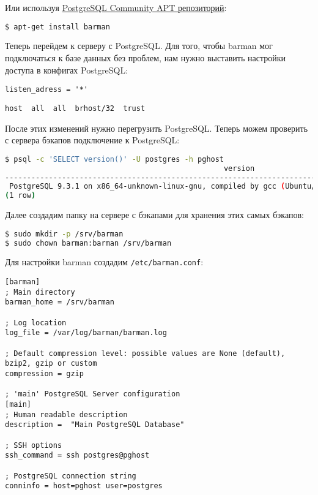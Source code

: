 Или используя \href{https://wiki.postgresql.org/wiki/Apt}{PostgreSQL Community APT репозиторий}:

\begin{lstlisting}[language=Bash,label=lst:barman-apt1,caption=Установка barman]
$ apt-get install barman
\end{lstlisting}

Теперь перейдем к серверу с PostgreSQL. Для того, чтобы barman мог подключаться к базе данных без проблем, нам нужно выставить настройки доступа в конфигах PostgreSQL:

\begin{lstlisting}[label=lst:barman4,caption=Отредактировать в postgresql.conf]
listen_adress = '*'
\end{lstlisting}

\begin{lstlisting}[label=lst:barman5,caption=Добавить в pg\_hba.conf]
host  all  all  brhost/32  trust
\end{lstlisting}

После этих изменений нужно перегрузить PostgreSQL. Теперь можем проверить с сервера бэкапов подключение к PostgreSQL:

\begin{lstlisting}[language=Bash,label=lst:barman6,caption=Проверка подключения к базе]
$ psql -c 'SELECT version()' -U postgres -h pghost
                                                  version
------------------------------------------------------------------------------------------------------------
 PostgreSQL 9.3.1 on x86_64-unknown-linux-gnu, compiled by gcc (Ubuntu/Linaro 4.7.2-2ubuntu1) 4.7.2, 64-bit
(1 row)
\end{lstlisting}

Далее создадим папку на сервере с бэкапами для хранения этих самых бэкапов:

\begin{lstlisting}[language=Bash,label=lst:barman7,caption=Папка для хранения бэкапов]
$ sudo mkdir -p /srv/barman
$ sudo chown barman:barman /srv/barman
\end{lstlisting}

Для настройки barman создадим \lstinline!/etc/barman.conf!:

\begin{lstlisting}[label=lst:barman8,caption=barman.conf]
[barman]
; Main directory
barman_home = /srv/barman

; Log location
log_file = /var/log/barman/barman.log

; Default compression level: possible values are None (default), bzip2, gzip or custom
compression = gzip

; 'main' PostgreSQL Server configuration
[main]
; Human readable description
description =  "Main PostgreSQL Database"

; SSH options
ssh_command = ssh postgres@pghost

; PostgreSQL connection string
conninfo = host=pghost user=postgres
\end{lstlisting}

